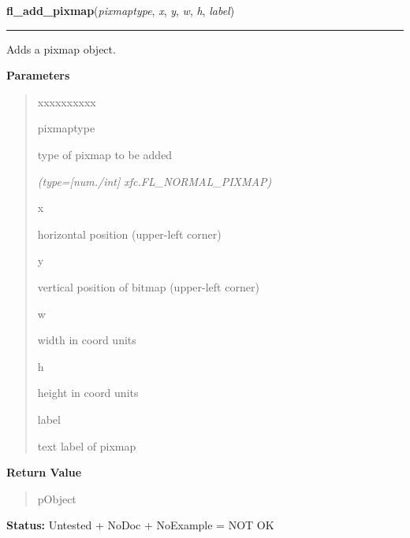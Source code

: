     \label{xformslib:library:fl_add_pixmap}

    \vspace{0.5ex}

\hspace{.8\funcindent}\begin{boxedminipage}{\funcwidth}

    \raggedright \textbf{fl\_add\_pixmap}(\textit{pixmaptype}, \textit{x}, \textit{y}, \textit{w}, \textit{h}, \textit{label})

    \vspace{-1.5ex}

    \rule{\textwidth}{0.5\fboxrule}
\setlength{\parskip}{2ex}
    Adds a pixmap object.

\setlength{\parskip}{1ex}
      \textbf{Parameters}
      \vspace{-1ex}

      \begin{quote}
        \begin{Ventry}{xxxxxxxxxx}

          \item[pixmaptype]

          type of pixmap to be added

            {\it (type=[num./int] xfc.FL\_NORMAL\_PIXMAP)}

          \item[x]

          horizontal position (upper-left corner)

          \item[y]

          vertical position of bitmap (upper-left corner)

          \item[w]

          width in coord units

          \item[h]

          height in coord units

          \item[label]

          text label of pixmap

        \end{Ventry}

      \end{quote}

      \textbf{Return Value}
    \vspace{-1ex}

      \begin{quote}
      pObject

      \end{quote}

\textbf{Status:} Untested + NoDoc + NoExample = NOT OK



    \end{boxedminipage}

